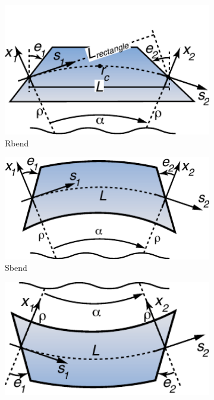 \begin{figure}[tb]
  \centering
  \hfill
  \begin{subfigure}[b]{0.32\textwidth}
    \includegraphics[width=1.05\textwidth]{rbend-coords.pdf}
    \caption{Rbend}
    \label{f:rbend}
  \end{subfigure}
  \begin{subfigure}[b]{0.32\textwidth}
    \includegraphics[width=1.05\textwidth]{sbend-coords.pdf}
    \caption{Sbend}
    \label{f:sbend}
  \end{subfigure}
  \begin{subfigure}[b]{0.32\textwidth}
    \includegraphics[width=1.05\textwidth]{sbend-rev.pdf}

\end{subfigure}
\end{figure}
